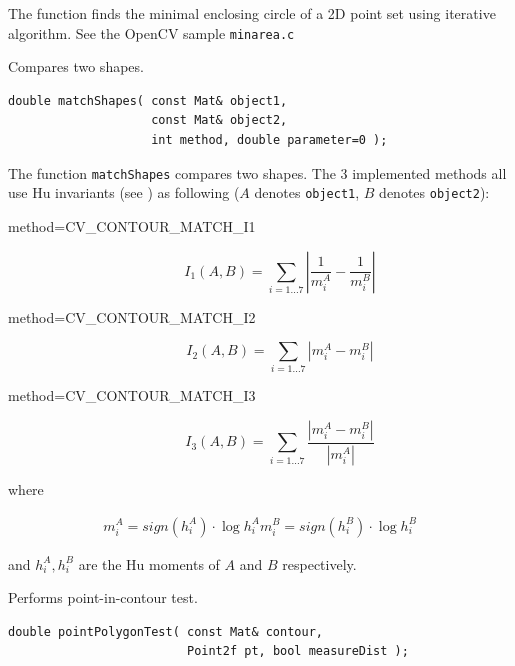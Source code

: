 \begin{description}
The function finds the minimal enclosing circle of a 2D point set using iterative algorithm. See the OpenCV sample \texttt{minarea.c}

\label{matchShapes}
Compares two shapes.

\begin{lstlisting}
double matchShapes( const Mat& object1,
                    const Mat& object2,
                    int method, double parameter=0 );
\end{lstlisting}
\begin{description}
\end{description}

The function \texttt{matchShapes} compares two shapes. The 3 implemented methods all use Hu invariants (see ) as following ($A$ denotes \texttt{object1}, $B$ denotes \texttt{object2}):

\begin{description}
\item[method=CV\_CONTOUR\_MATCH\_I1]
\[ I_1(A,B) = \sum_{i=1...7} \left| \frac{1}{m^A_i} - \frac{1}{m^B_i} \right| \]

\item[method=CV\_CONTOUR\_MATCH\_I2]
\[ I_2(A,B) = \sum_{i=1...7} \left| m^A_i - m^B_i \right| \]

\item[method=CV\_CONTOUR\_MATCH\_I3]
\[ I_3(A,B) = \sum_{i=1...7} \frac{ \left| m^A_i - m^B_i \right| }{ \left| m^A_i \right| } \]
\end{description}

where

\[
\begin{array}{l}
m^A_i = sign(h^A_i) \cdot \log{h^A_i}
m^B_i = sign(h^B_i) \cdot \log{h^B_i}
\end{array}
\]

and $h^A_i, h^B_i$ are the Hu moments of $A$ and $B$ respectively.


\label{pointPolygonTest}
Performs point-in-contour test.

\begin{lstlisting}
double pointPolygonTest( const Mat& contour,
                         Point2f pt, bool measureDist );
\end{lstlisting}
\begin{description}
\end{description}


\end{description}
